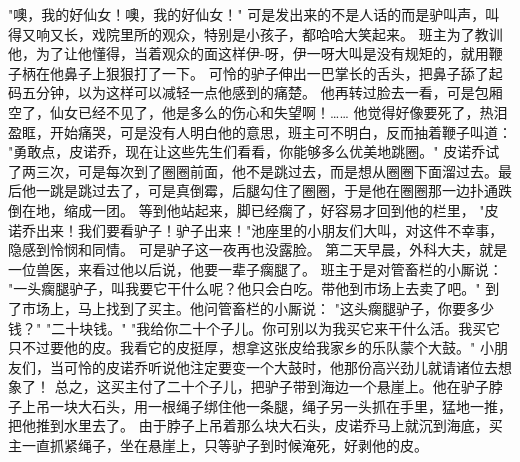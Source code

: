 \documentclass[12pt,UTF8]{ctexbook}
\begin{document}
"噢，我的好仙女！噢，我的好仙女！"
可是发出来的不是人话的而是驴叫声，叫得又响又长，戏院里所的观众，特别是小孩子，都哈哈大笑起来。
班主为了教训他，为了让他懂得，当着观众的面这样伊-呀，伊一呀大叫是没有规矩的，就用鞭子柄在他鼻子上狠狠打了一下。
可怜的驴子伸出一巴掌长的舌头，把鼻子舔了起码五分钟，以为这样可以减轻一点他感到的痛楚。
他再转过脸去一看，可是包厢空了，仙女已经不见了，他是多么的伤心和失望啊！……
他觉得好像要死了，热泪盈眶，开始痛哭，可是没有人明白他的意思，班主可不明白，反而抽着鞭子叫道：
"勇敢点，皮诺乔，现在让这些先生们看看，你能够多么优美地跳圈。"
皮诺乔试了两三次，可是每次到了圈圈前面，他不是跳过去，而是想从圈圈下面溜过去。最后他一跳是跳过去了，可是真倒霉，后腿勾住了圈圈，于是他在圈圈那一边扑通跌倒在地，缩成一团。
等到他站起来，脚已经瘸了，好容易才回到他的栏里，
"皮诺乔出来！我们要看驴子！驴子出来！"池座里的小朋友们大叫，对这件不幸事，隐感到怜悯和同情。
可是驴子这一夜再也没露脸。
第二天早晨，外科大夫，就是一位兽医，来看过他以后说，他要一辈子瘸腿了。
班主于是对管畜栏的小厮说：
"一头瘸腿驴子，叫我要它干什么呢？他只会白吃。带他到市场上去卖了吧。"
到了市场上，马上找到了买主。他问管畜栏的小厮说：
"这头瘸腿驴子，你要多少钱？"
"二十块钱。"
"我给你二十个子儿。你可别以为我买它来干什么活。我买它只不过要他的皮。我看它的皮挺厚，想拿这张皮给我家乡的乐队蒙个大鼓。"
小朋友们，当可怜的皮诺乔听说他注定要变一个大鼓时，他那份高兴劲儿就请诸位去想象了！
总之，这买主付了二十个子儿，把驴子带到海边一个悬崖上。他在驴子脖子上吊一块大石头，用一根绳子绑住他一条腿，绳子另一头抓在手里，猛地一推，把他推到水里去了。
由于脖子上吊着那么块大石头，皮诺乔马上就沉到海底，买主一直抓紧绳子，坐在悬崖上，只等驴子到时候淹死，好剥他的皮。

\chapter{}
\end{document}
